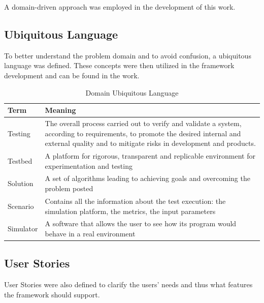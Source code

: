 \documentclass[12pt,a4paper,openright,twoside]{book}
\begin{document}
A domain-driven approach was employed in the development of this work.

\subsection{Ubiquitous Language}

To better understand the problem domain and to avoid confusion, a ubiquitous language was defined.
These concepts were then utilized in the framework development and can be found in the work.

\begin{table}[H]
  \centering
  \begin{tabular}{|l|p{}|}
    \toprule
    \textbf{Term} & \textbf{Meaning}                                                                                                                                                                                    \\
    \midrule
    Testing       & The overall process carried out to verify and validate a system, according to requirements, to promote the desired internal and external quality and to mitigate risks in development and products. \\ \hline
    Testbed       & A platform for rigorous, transparent and replicable environment for experimentation and testing                                                                                                     \\ \hline
    Solution      & A set of algorithms leading to achieving goals and overcoming the problem posted                                                                                                                    \\ \hline
    Scenario      & Contains all the information about the test execution: the simulation platform, the metrics, the input parameters                                                                                   \\ \hline
    Simulator     & A software that allows the user to see how its program would behave in a real environment                                                                                                           \\ \hline
  \end{tabular}
  \caption{Domain Ubiquitous Language}
\end{table}

\subsection{User Stories}
User Stories were also defined to clarify the users' needs and thus what features the framework should support.
\end{document}
